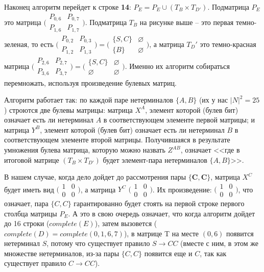 \documentclass[russian,table]{article}
\begin{document}
Наконец алгоритм перейдет к строке \textbf{14}: $P_E = P_E \cup (T_B \times T_{D'})$. Подматрица $P_E$ это матрица $\bigl(\begin{smallmatrix} P_{0, 6} & P_{0, 7} \\ P_{1, 6} &P_{1, 7} \end{smallmatrix} \bigr)$. Подматрица $T_B$ на рисунке выше -- это первая темно-зеленая, то есть $\bigl(\begin{smallmatrix} P_{0, 2} & P_{0, 3} \\ P_{1, 2} &P_{1, 3} \end{smallmatrix} \bigr) = \bigl(\begin{smallmatrix} \{S, C\} & \varnothing \\ \{B\} & \varnothing \end{smallmatrix} \bigr)$, а матрица $T_D'$ это темно-красная матрица $\bigl(\begin{smallmatrix} P_{2, 6} & P_{2, 7} \\ P_{3, 6} &P_{3, 7} \end{smallmatrix} \bigr)  = \bigl(\begin{smallmatrix} \{S, C\} & \varnothing \\ \varnothing & \varnothing \end{smallmatrix} \bigr)$. Именно их алгоритм собираться перемножать, используя произведение булевых матриц.

Алгоритм работает так: по каждой паре нетерминалов $\{A, B\}$ (их у нас $|N|^2 = 25$) строются две булевы матрицы: матрица $X^A$, элемент которой (булев бит) означает есть ли нетерминал $A$ в соответствующем элементе первой матрицы; и матрица $Y^B$, элемент которой (булев бит) означает есть ли нетерминал $B$ в соответствующем элементе второй матрицы. Получившаяся в результате умножения булева матрица, которую можно назвать $Z^{AB}$, означает <<где в итоговой матрице $(T_B \times T_{D'})$ будет элемент-пара нетерминалов $\{A, B\}$>>. 

В нашем случае, когда дело дойдет до рассмотрения пары $\mathbf{\{C, C\}}$, матрица $X^C$ будет иметь вид $\bigl(\begin{smallmatrix} 1&0\\0&0 \end{smallmatrix} \bigr)$, а матрица $Y^C$ $\bigl(\begin{smallmatrix} 1&0\\0&0 \end{smallmatrix} \bigr)$. Их произведение: $\bigl(\begin{smallmatrix} 1&0\\0&0 \end{smallmatrix} \bigr)$, что означает, пара $\{C, C\}$ гарантированно будет стоять на первой строке первого столбца матрицы $P_E$. А это в свою очередь означает, что когда алгоритм дойдет до 16 строки ($complete(E)$), затем вызовется ($complete(D) = complete(0, 1, 6, 7)$), в матрице T на месте $(0, 6)$ появится нетерминал $S$, потому что существует правило $S \to CC$ (вместе с ним, в этом же множестве нетерминалов, из-за пары $\{C, C\}$ появится еще и $C$, так как существует правило $C \to CC$).
\end{document}
